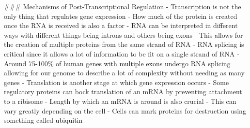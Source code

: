 \documentclass[letterpaper]{article}
\begin{document}
\#\#\# Mechanisms of Post-Transcriptional Regulation - Transcription is not
the only thing that regulates gene expression - How much of the protein
is created once the RNA is received is also a factor - RNA can be
interpreted in different ways with different things being introns and
others being exons - This allows for the creation of multiple proteins
from the same strand of RNA - RNA splicing is critical since it allows a
lot of information to be fit on a single strand of RNA - Around 75-100\%
of human genes with multiple exons undergo RNA splicing allowing for our
genome to describe a lot of complexity without needing as many genes -
Translation is another stage at which gene expression occurs - Some
regulatory proteins can bock translation of an mRNA by preventing
attachment to a ribisome - Length by which an mRNA is around is also
crucial - This can vary greatly depending on the cell - Cells can mark
proteins for destruction using something called ubiquitin
\end{document}
